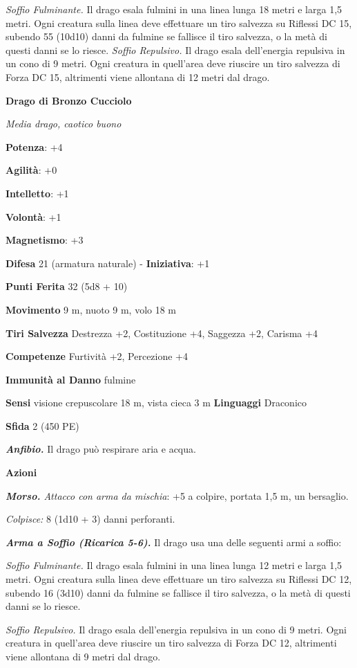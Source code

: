 \begin{multicols}{2}
\emph{Soffio Fulminante.} Il drago esala fulmini in una linea lunga 18
metri e larga 1,5 metri. Ogni creatura sulla linea deve effettuare un
tiro salvezza su Riflessi DC 15, subendo 55 (10d10) danni da fulmine se
fallisce il tiro salvezza, o la metà di questi danni se lo riesce.
\emph{Soffio Repulsivo.} Il drago esala dell'energia repulsiva in un
cono di 9 metri. Ogni creatura in quell'area deve riuscire un tiro
salvezza di Forza DC 15, altrimenti viene allontana di 12 metri dal
drago.

\textbf{Drago di Bronzo Cucciolo}

\emph{Media drago, caotico buono}

\textbf{Potenza}: +4

\textbf{Agilità}: +0

\textbf{Intelletto}: +1

\textbf{Volontà}: +1

\textbf{Magnetismo}: +3

\textbf{Difesa} 21 (armatura naturale) - \textbf{Iniziativa}: +1

\textbf{Punti Ferita} 32 (5d8 + 10)

\textbf{Movimento} 9 m, nuoto 9 m, volo 18 m

\textbf{Tiri Salvezza} Destrezza +2, Costituzione +4, Saggezza +2,
Carisma +4

\textbf{Competenze} Furtività +2, Percezione +4

\textbf{Immunità al Danno} fulmine

\textbf{Sensi} visione crepuscolare 18 m, vista cieca 3 m
\textbf{Linguaggi} Draconico

\textbf{Sfida} 2 (450 PE)

\emph{\textbf{Anfibio.}} Il drago può respirare aria e acqua.

\textbf{Azioni}

\emph{\textbf{Morso.} Attacco con arma da mischia}: +5 a colpire,
portata 1,5 m, un bersaglio.

\emph{Colpisce:} 8 (1d10 + 3) danni perforanti.

\emph{\textbf{Arma a Soffio (Ricarica 5-6).}} Il drago usa una delle
seguenti armi a soffio:

\emph{Soffio Fulminante.} Il drago esala fulmini in una linea lunga 12
metri e larga 1,5 metri. Ogni creatura sulla linea deve effettuare un
tiro salvezza su Riflessi DC 12, subendo 16 (3d10) danni da fulmine se
fallisce il tiro salvezza, o la metà di questi danni se lo riesce.

\emph{Soffio Repulsivo.} Il drago esala dell'energia repulsiva in un
cono di 9 metri. Ogni creatura in quell'area deve riuscire un tiro
salvezza di Forza DC 12, altrimenti viene allontana di 9 metri dal
drago.


\end{multicols}
